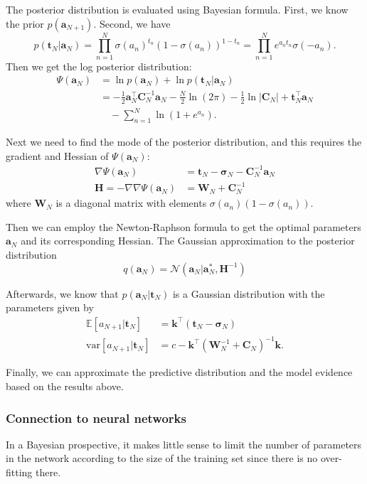 \documentclass[a4paper]{book}
\newcommand{\up}{\mathrm}
\renewcommand{\bf}{\mathbf}
\renewcommand{\cal}{\mathcal}
\newcommand{\bb}{\mathbb}
\newcommand{\bs}{\boldsymbol}
\begin{document}
The posterior distribution is evaluated using Bayesian formula. First, we know the prior $p(\bf{a}_{N+1})$. Second, we have
\begin{equation}
	p(\bf{t}_N|\bf{a}_N) = \prod_{n=1}^N \sigma(a_n)^{t_n} (1-\sigma(a_n))^{1-t_n} = \prod_{n=1}^N e^{a_n t_n}\sigma(-a_n).
\end{equation}
Then we get the log posterior distribution:
\begin{align}
	\Psi(\bf{a}_N) &= \ln p(\bf{a}_N) + \ln p(\bf{t}_N|\bf{a}_N) \\
	&= -\frac{1}{2} \bf{a}_N^{\intercal} \bf{C}_N^{-1} \bf{a}_N - \frac{N}{2} \ln (2\pi) - \frac{1}{2} \ln |\bf{C}_N| + \bf{t}_N^{\intercal}\bf{a}_N \\
	&\quad  -\sum_{n=1}^N \ln (1+e^{a_n}).
\end{align}

Next we need to find the mode of the posterior distribution, and this requires the gradient and Hessian of $\Psi(\bf{a}_N)$:
\begin{align}
	\nabla \Psi(\bf{a}_N) &= \bf{t}_N - \bs{\sigma}_N - \bf{C}_N^{-1} \bf{a}_N \\
    \bf{H} = -\nabla\nabla \Psi(\bf{a}_N) &=  \bf{W}_N + \bf{C}_N^{-1}
\end{align}
where $\bf{W}_N$ is a diagonal matrix with elements $\sigma(a_n)(1-\sigma(a_n))$.

Then we can employ the Newton-Raphson formula to get the optimal parameters $\bf{a}_N$ and its corresponding Hessian. The Gaussian approximation to the posterior distribution
\begin{equation}
	q(\bf{a}_N) = \cal{N}(\bf{a}_N|\bf{a}_N^*,\bf{H}^{-1})
\end{equation}

Afterwards, we know that $p(\bf{a}_N|\bf{t}_N)$ is a Gaussian distribution with the parameters given by
\begin{align}
	\bb{E}[a_{N+1}|\bf{t}_N] &= \bf{k}^{\intercal} (\bf{t}_N - \bs{\sigma}_N) \\
	\up{var}[a_{N+1}|\bf{t}_N] &= c - \bf{k}^{\intercal} (\bf{W}_N^{-1}+\bf{C}_N)^{-1} \bf{k}.
\end{align}

Finally, we can approximate the predictive distribution and the model evidence based on the results above.

\subsubsection{Connection to neural networks}
In a Bayesian prospective, it makes little sense to limit the number of parameters in the network according to the size of the training set since there is no over-fitting there.
\end{document}
